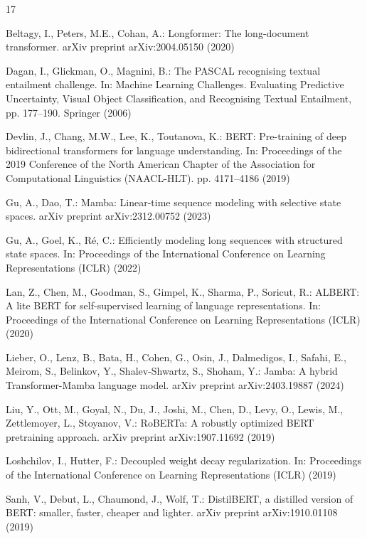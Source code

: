 \documentclass[runningheads]{llncs}
\begin{document}
\begin{thebibliography}{17}

 Beltagy, I., Peters, M.E., Cohan, A.: Longformer: The long-document transformer. arXiv preprint arXiv:2004.05150 (2020)

 Dagan, I., Glickman, O., Magnini, B.: The PASCAL recognising textual entailment challenge. In: Machine Learning Challenges. Evaluating Predictive Uncertainty, Visual Object Classification, and Recognising Textual Entailment, pp. 177–190. Springer (2006)

 Devlin, J., Chang, M.W., Lee, K., Toutanova, K.: BERT: Pre-training of deep bidirectional transformers for language understanding. In: Proceedings of the 2019 Conference of the North American Chapter of the Association for Computational Linguistics (NAACL-HLT). pp. 4171–4186 (2019)

 Gu, A., Dao, T.: Mamba: Linear-time sequence modeling with selective state spaces. arXiv preprint arXiv:2312.00752 (2023)

 Gu, A., Goel, K., Ré, C.: Efficiently modeling long sequences with structured state spaces. In: Proceedings of the International Conference on Learning Representations (ICLR) (2022)

 Lan, Z., Chen, M., Goodman, S., Gimpel, K., Sharma, P., Soricut, R.: ALBERT: A lite BERT for self-supervised learning of language representations. In: Proceedings of the International Conference on Learning Representations (ICLR) (2020)

 Lieber, O., Lenz, B., Bata, H., Cohen, G., Osin, J., Dalmedigos, I., Safahi, E., Meirom, S., Belinkov, Y., Shalev-Shwartz, S., Shoham, Y.: Jamba: A hybrid Transformer-Mamba language model. arXiv preprint arXiv:2403.19887 (2024)

 Liu, Y., Ott, M., Goyal, N., Du, J., Joshi, M., Chen, D., Levy, O., Lewis, M., Zettlemoyer, L., Stoyanov, V.: RoBERTa: A robustly optimized BERT pretraining approach. arXiv preprint arXiv:1907.11692 (2019)

 Loshchilov, I., Hutter, F.: Decoupled weight decay regularization. In: Proceedings of the International Conference on Learning Representations (ICLR) (2019)

 Sanh, V., Debut, L., Chaumond, J., Wolf, T.: DistilBERT, a distilled version of BERT: smaller, faster, cheaper and lighter. arXiv preprint arXiv:1910.01108 (2019)


\end{thebibliography}
\end{document}
